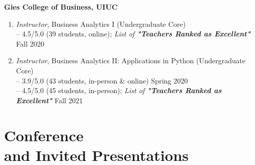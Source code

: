 \documentclass[margin,line]{resume}
\begin{document}
\begin{resume}
         \textbf{Gies College of Business, UIUC}
         \begin{enumerate}[topsep=1pt, leftmargin=*]
         \item {\sl Instructor}, Business Analytics I (Undergraduate Core)\\ [0.3em]
         -- 4.5/5.0 (39 students, online); \textit{List of \textbf{"Teachers Ranked as Excellent"} } \hfill Fall 2020
         \item {\sl Instructor}, Business Analytics II: Applications in Python (Undergraduate Core)\\[0.3em]
         -- 3.9/5.0 (43 students, in-person \& online)  \hfill Spring 2020\\
         -- 4.5/5.0 (45 students, in-person); \textit{List of \textbf{"Teachers Ranked as Excellent"} } \hfill Fall 2021
         \end{enumerate}

       
 	  \section{\mysidestyle Conference\\ and Invited Presentations} 
 	  
 	  \begin{enumerate}[topsep=0pt, leftmargin=*]
 	           

\end{enumerate}
\end{resume}
\end{document}
